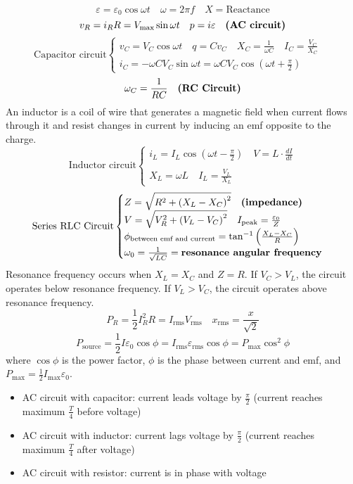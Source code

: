 \documentclass[8pt,twocolumn]{extarticle}
\begin{document}
\[\varepsilon=\varepsilon_0 \cos\omega t\quad \omega=2\pi f\quad X=\text{Reactance}\]
\[v_R = i_R R = V_\text{max}\sin\omega t\quad p=i\varepsilon\quad\text{\textbf{(AC circuit)}}\]
\[\text{Capacitor circuit}\begin{cases}
    v_C = V_C\cos\omega t\quad q=Cv_C\quad X_C=\frac{1}{\omega C}\quad I_C=\frac{V_C}{X_C}\quad \\
    i_C=-\omega CV_C\sin\omega t=\omega CV_C\cos(\omega t + \frac{\pi}{2})
\end{cases}\]
\[\omega_C = \frac{1}{RC}\quad\text{\textbf{(RC Circuit)}}\]
An inductor is a coil of wire that generates a magnetic field when current flows through it and
resist changes in current by inducing an emf opposite to the charge.
\[\text{Inductor circuit}\begin{cases}
    i_L = I_L\cos(\omega t - \frac{\pi}{2})\quad V=L\cdot \frac{dI}{dt} \\ \\
    X_L=\omega L\quad I_L=\frac{V_L}{X_L}
\end{cases}\]
\[\text{Series RLC Circuit}\begin{cases}
    Z=\sqrt{R^2 + {(X_L - X_C)}^2}\quad\text{\textbf{(impedance)}} \\
    V=\sqrt{V_R^2 + {(V_L - V_C)}^2}\quad I_\text{peak}=\frac{\varepsilon_0}{Z} \\
    \phi_\text{between emf and current} = \tan^{-1}\Big(\frac{X_L - X_C}{R}\Big) \\
    \omega_0 = \frac{1}{\sqrt{LC}}=\text{\textbf{resonance angular frequency}}
\end{cases}\]
Resonance frequency occurs when $X_L=X_C$ and $Z=R$. If $V_C > V_L$, the circuit operates below resonance frequency. If $V_L > V_C$, the circuit operates above resonance frequency.
\[P_R = \frac{1}{2}I_R^2 R=I_\text{rms}V_\text{rms}\quad x_\text{rms}=\frac{x}{\sqrt{2}}\]
\[P_\text{source}=\frac{1}{2}I\varepsilon_0\cos\phi = I_\text{rms}\varepsilon_\text{rms}\cos\phi=
P_\text{max}\cos^2\phi\]
where $\cos\phi$ is the power factor, $\phi$ is the phase between current and emf, and $P_\text{max}=
\frac{1}{2}I_\text{max}\varepsilon_0$.
\begin{itemize}
    \item AC circuit with capacitor: current leads voltage by $\frac{\pi}{2}$ (current reaches
    maximum $\frac{T}{4}$ before voltage)
    \item AC circuit with inductor: current lags voltage by $\frac{\pi}{2}$ (current reaches
    maximum $\frac{T}{4}$ after voltage)
    \item AC circuit with resistor: current is in phase with voltage
\end{itemize}
\end{document}

